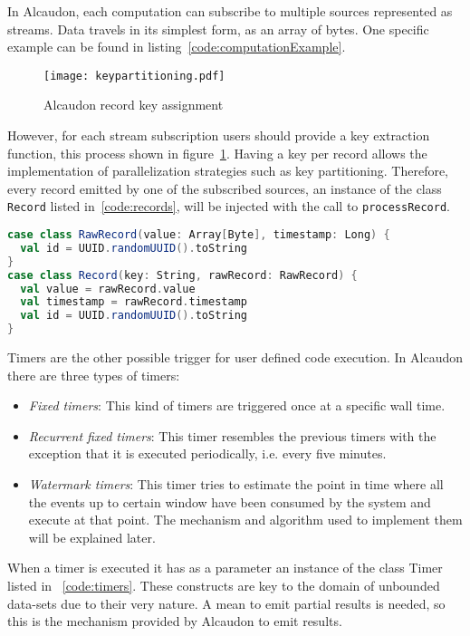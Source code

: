 In Alcaudon, each computation can subscribe to multiple sources represented as
streams. Data travels in its simplest form, as an array of bytes. One specific
example can be found in listing~\ref{code:computationExample}.

\begin{figure}
  \begin{center}
    \texttt{[image: keypartitioning.pdf]}
    \caption{Alcaudon record key assignment}
    \label{fig:keypartitioning}
  \end{center}
\end{figure}

However, for each stream subscription users should provide a key extraction
function, this process shown in figure~\ref{fig:keypartitioning}. Having a key
per record allows the implementation of parallelization strategies such as key
partitioning. Therefore, every record emitted by one of the subscribed sources,
an instance of the class \lstinline[columns=fixed]{Record} listed
in~\ref{code:records}, will be injected with the call to
\lstinline[columns=fixed]{processRecord}.

\begin{lstlisting}[language=scala, frame=trBL, label=code:records, float=ht, caption = {Record classes}]
case class RawRecord(value: Array[Byte], timestamp: Long) {
  val id = UUID.randomUUID().toString
}
case class Record(key: String, rawRecord: RawRecord) {
  val value = rawRecord.value
  val timestamp = rawRecord.timestamp
  val id = UUID.randomUUID().toString
}
\end{lstlisting}

Timers are the other possible trigger for user defined code execution. In
Alcaudon there are three types of timers:
%
\begin{itemize}
\item \textit{Fixed timers}: This kind of timers are triggered once at a
  specific wall time.
\item \textit{Recurrent fixed timers}: This timer resembles the previous timers
  with the exception that it is executed periodically, i.e. every five minutes.
\item \textit{Watermark timers}: This timer tries to estimate the point in time
  where all the events up to certain window have been consumed by the system and
  execute at that point. The mechanism and algorithm used to implement them will be
  explained later.
\end{itemize}

When a timer is executed it has as a parameter an instance of the class Timer
listed in ~\ref{code:timers}. These constructs are key to the domain of unbounded
data-sets due to their very nature. A mean to emit partial results is needed, so
this is the mechanism provided by Alcaudon to emit results.

